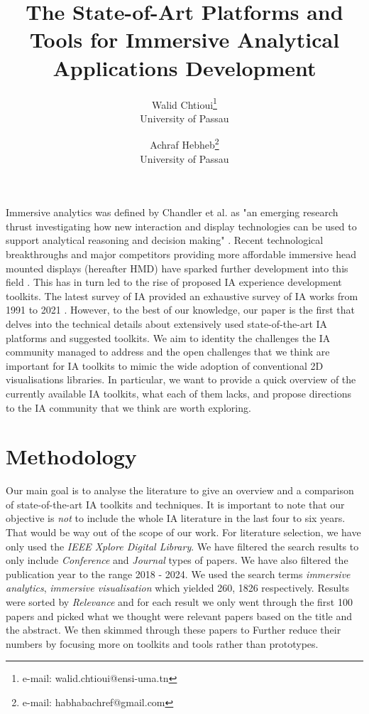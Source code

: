 \documentclass{vgtc}                          %
\title{The State-of-Art Platforms and Tools for Immersive Analytical
Applications Development}
\author{Walid Chtioui\thanks{e-mail: walid.chtioui@ensi-uma.tn}\\ %
        \scriptsize University of Passau %
\and Achraf Hebheb\thanks{e-mail: habhabachref@gmail.com}\\ %
     \scriptsize University of Passau}
\begin{document}
\maketitle

Immersive analytics was defined by Chandler et al. as "an emerging research thrust investigating how new
interaction and display technologies can be used to support analytical reasoning and decision making"
\cite{ia}. Recent technological breakthroughs and major competitors providing more affordable immersive head
mounted displays (hereafter HMD) have sparked further development into this field
\cite{web:vision_pro_unity}. This has in turn led to the rise of proposed IA experience development toolkits.
The latest survey of IA provided an exhaustive survey of IA works from 1991 to 2021 \cite{survey_of_ia}.
However, to the best of our knowledge, our paper is the first that delves into the technical details about
extensively used state-of-the-art IA platforms and suggested toolkits. We aim to identity the challenges
the IA community managed to address and the open challenges that we think are important for IA toolkits
to mimic the wide adoption of conventional 2D visualisations libraries. In particular, we want to provide
a quick overview of the currently available IA toolkits, what each of them lacks, and propose directions
to the IA community that we think are worth exploring.


\section{Methodology}

\noindent Our main goal is to analyse the literature to give an overview and a comparison of 
state-of-the-art IA toolkits and techniques. It is important to note that our objective is \textit{not} to
include the whole IA literature in the last four to six years. That would be way out of the scope of our
work. For literature selection, we have only used the \textit{IEEE Xplore Digital Library}. We have filtered
the search results to only include \textit{Conference} and \textit{Journal} types of papers. We have also filtered
the publication year to the range 2018 - 2024. We used the search terms \textit{immersive analytics},
\textit{immersive visualisation} which yielded 260, 1826 respectively. Results were sorted by
\textit{Relevance} and for each result we only went through the first 100 papers and picked what we thought
were relevant papers based on the title and the abstract. We then skimmed through these papers to Further
reduce their numbers by focusing more on toolkits and tools rather than prototypes.
\end{document}

